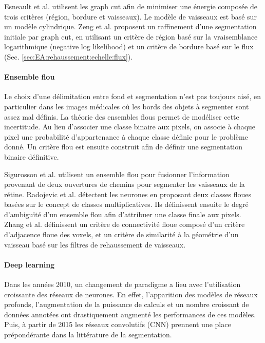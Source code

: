       Esneault et al. \cite{Esneault2009_moments_graph_cut} utilisent les graph cut afin de minimiser une énergie composée de trois critères (région, bordure et vaisseaux). Le modèle de vaisseaux est basé sur un modèle cylindrique. Zeng et al. \cite{Zeng2017_liver_oof_graph_cut} proposent un raffinement d'une segmentation initiale par graph cut, en utilisant un critère de région basé sur la vraisemblance logarithmique (negative log likelihood) et un critère de bordure basé sur le flux (Sec. \ref{sec:EA:rehaussement:echelle:flux}).

      \paragraph{Ensemble flou}

      Le choix d'une délimitation entre fond et segmentation n'est pas toujours aisé, en particulier dans les images médicales où les bords des objets à segmenter sont assez mal définis. La théorie des ensembles flous permet de modéliser cette incertitude. Au lieu d'associer une classe binaire aux pixels, on associe à chaque pixel une probabilité d'appartenance à chaque classe définie pour le problème donné. Un critère flou est ensuite construit afin de définir une segmentation binaire définitive.

      Sigurosson et al. \cite{Sigurosson2014_retinal_morpho_fuzzy} utilisent un ensemble flou pour fusionner l'information provenant de deux ouvertures de chemins pour segmenter les vaisseaux de la rétine. 
      Radojevic et al. \cite{Radojevic2015_fuzzy_logic} détectent les neurones en proposant deux classes floues basées sur le concept de classes multiplicatives. Ils définissent ensuite le degré d'ambiguïté d'un ensemble flou afin d'attribuer une classe finale aux pixels.
      Zhang et al. \cite{Zhang2018_liver_fuzzy_connectedness} définissent un critère de connectivité floue composé d'un critère d'adjacence floue des voxels, et un critère de similarité à la géométrie d'un vaisseau basé sur les filtres de rehaussement de vaisseaux.  

      \paragraph{Deep learning}

      Dans les années 2010, un changement de paradigme a lieu avec l'utilisation croissante des réseaux de neurones. En effet, l'apparition des modèles de réseaux profonds, l'augmentation de la puissance de calculs et un nombre croissant de données annotées ont drastiquement augmenté les performances de ces modèles. Puis, à partir de 2015 les réseaux convolutifs (CNN) prennent une place prépondérante dans la littérature de la segmentation. 
      

